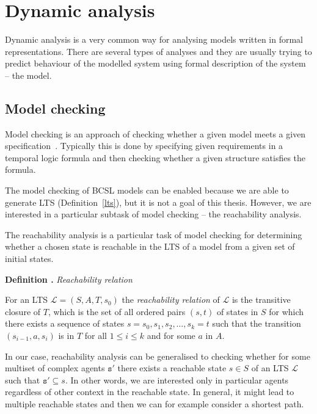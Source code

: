 \documentclass[12pt, twoside]{fithesis2} %
\newcounter{counter}[section]
\renewcommand{\thecounter}{\thesection.\arabic{counter}}
\newenvironment{definition}[1]{\bigskip\refstepcounter{counter}\noindent\textbf{Definition \thecounter } \emph{#1} \par\nopagebreak \begin{itshape}}{\end{itshape}\bigskip}
\begin{document}
\section{Dynamic analysis}

Dynamic analysis is a very common way for analysing models written in formal representations. There are several types of analyses and they are usually trying to predict behaviour of the modelled system using formal description of the system -- the model.

\subsection{Model checking}

Model checking is an approach of checking whether a given model meets a given specification~\cite{clarke1999model}. Typically this is done by specifying given requirements in a temporal logic formula and then checking whether a given structure satisfies the formula.

The model checking of BCSL models can be enabled because we are able to generate LTS (Definition~\ref{lts}), but it is not a goal of this thesis. However, we are interested in a particular subtask of model checking -- the reachability analysis.

The reachability analysis is a particular task of model checking for determining whether a chosen state is reachable in the LTS of a model from a given set of initial states.

\begin{definition}{Reachability relation}
\label{reachability_relation}
For an LTS $\mathcal{L} = (S, A, T, s_0)$ the \emph{reachability relation} of $\mathcal{L}$ is the transitive closure of $T$, which is the set of all ordered pairs $(s,t)$ of states in $S$ for which there exists a sequence of states $s = s_0, s_1, s_2, \ldots, s_k = t$ such that the transition $(s_{i-1}, a, s_i)$ is in $T$ for all $1 \leq i \leq k$ and for some $a$ in $A$.
\end{definition}

In our case, reachability analysis can be generalised to checking whether for some multiset of complex agents $\mathtt{s}'$ there exists a reachable state $s \in S$ of an LTS $\mathcal{L}$ such that $\mathtt{s}' \subseteq s$. In other words, we are interested only in particular agents regardless of other context in the reachable state. In general, it might lead to multiple reachable states and then we can for example consider a shortest path.
\end{document}
